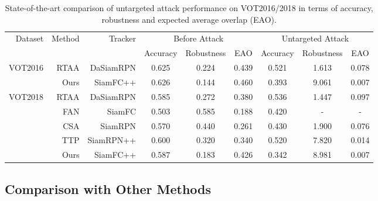 \documentclass[journal]{IEEEtran}
\begin{document}
\begin{table}[t]
  \centering
  \caption{State-of-the-art comparison of untargeted attack performance on VOT2016/2018 in terms of accuracy, robustness and expected average overlap (EAO).}
  \begin{tabular}{rrrcccccc}
  \toprule
  \multirow{2}{*}[-2pt]{Dataset} & \multirow{2}{*}[-2pt]{Method} & \multirow{2}{*}[-2pt]{Tracker} & \multicolumn{3}{c}{Before Attack} & \multicolumn{3}{c}{Untargeted Attack} \\ \cmidrule{4-9}
                           &                         &                          & Accuracy   & Robustness  & EAO    & Accuracy    & Robustness    & EAO     \\ \midrule
  \multirow{2}{*}{VOT2016} & RTAA                    & DaSiamRPN                & 0.625      & 0.224       & 0.439  & 0.521       & 1.613         & 0.078   \\
                           & Ours                    & SiamFC++                 & 0.626      & 0.144       & 0.460  & 0.393       & 9.061         & 0.007   \\ \midrule
  \multirow{5}{*}{VOT2018} & RTAA                    & DaSiamRPN                & 0.585      & 0.272       & 0.380  & 0.536       & 1.447         & 0.097   \\
                           & FAN                     & SiamFC                   & 0.503      & 0.585       & 0.188  & 0.420       & -             & -       \\
                           & CSA                     & SiamRPN                  & 0.570      & 0.440       & 0.261  & 0.430       & 1.900         & 0.076   \\
                           & TTP                     & SiamRPN++                & 0.600      & 0.320       & 0.340  & 0.520       & 7.820         & 0.014   \\
                           & Ours                    & SiamFC++                 & 0.587      & 0.183       & 0.426  & 0.342       & 8.981         & 0.007   \\ \bottomrule
  \end{tabular}
  \label{tab:sota_vot}
\end{table}

\subsection{Comparison with Other Methods}
\end{document}
